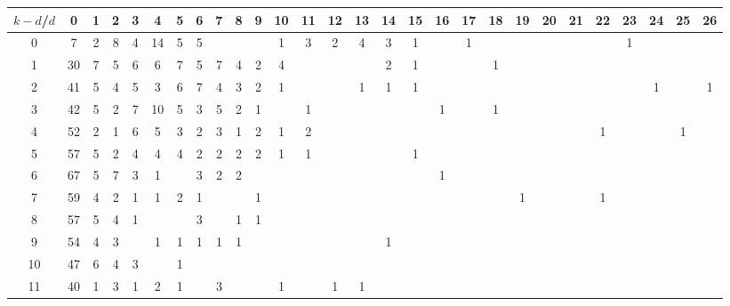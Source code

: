 \documentclass{article}
\begin{document}
\begin{table}[h]\footnotesize
{\centering
\begin{tabular}{|c|c|
c|c|c|c|c|c|c|c|c|c|c|c|c|c|c|c|c|c|c|c|c|c|c|c|c|c|}
  \hline
  $k-d$/$d$ 
 & 0 & 1 & 2 & 3 & 4 & 5 & 6 & 7 & 8 & 9 & 10 & 11 & 12 & 13 & 14 & 15 & 16 & 17 & 18 & 19 & 20 & 21 & 22 & 23 & 24 & 25 & 26\\

  \hline
  \hline

0  & 7 & 2 & 8 & 4 & 14 & 5 & 5 &  &  &  & 1 & 3 & 2 & 4 & 3 & 1 &  & 1 &  &  &  &  &  & 1 &  &  & \\

1  & 30 & 7 & 5 & 6 & 6 & 7 & 5 & 7 & 4 & 2 & 4 &  &  &  & 2 & 1 &  &  & 1 &  &  &  &  &  &  &  & \\

2  & 41 & 5 & 4 & 5 & 3 & 6 & 7 & 4 & 3 & 2 & 1 &  &  & 1 & 1 & 1 &  &  &  &  &  &  &  &  & 1 &  & 1\\

3  & 42 & 5 & 2 & 7 & 10 & 5 & 3 & 5 & 2 & 1 &  & 1 &  &  &  &  & 1 &  & 1 &  &  &  &  &  &  &  & \\

4  & 52 & 2 & 1 & 6 & 5 & 3 & 2 & 3 & 1 & 2 & 1 & 2 &  &  &  &  &  &  &  &  &  &  & 1 &  &  & 1 & \\

5  & 57 & 5 & 2 & 4 & 4 & 4 & 2 & 2 & 2 & 2 & 1 & 1 &  &  &  & 1 &  &  &  &  &  &  &  &  &  &  & \\

6  & 67 & 5 & 7 & 3 & 1 &  & 3 & 2 & 2 &  &  &  &  &  &  &  & 1 &  &  &  &  &  &  &  &  &  & \\

7  & 59 & 4 & 2 & 1 & 1 & 2 & 1 &  &  & 1 &  &  &  &  &  &  &  &  &  & 1 &  &  & 1 &  &  &  & \\

8  & 57 & 5 & 4 & 1 &  &  & 3 &  & 1 & 1 &  &  &  &  &  &  &  &  &  &  &  &  &  &  &  &  & \\

9  & 54 & 4 & 3 &  & 1 & 1 & 1 & 1 & 1 &  &  &  &  &  & 1 &  &  &  &  &  &  &  &  &  &  &  & \\

10  & 47 & 6 & 4 & 3 &  & 1 &  &  &  &  &  &  &  &  &  &  &  &  &  &  &  &  &  &  &  &  & \\

11  & 40 & 1 & 3 & 1 & 2 & 1 &  & 3 &  &  & 1 &  & 1 & 1 &  &  &  &  &  &  &  &  &  &  &  &  & \\


\end{tabular}}
\end{table}
\end{document}
